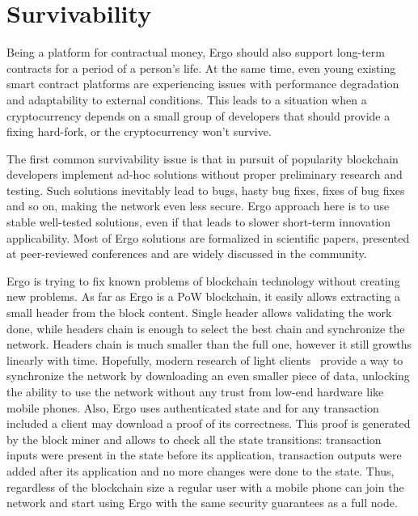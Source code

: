 \section{Survivability}
\label{sec:survivability}


Being a platform for contractual money, Ergo should also support long-term contracts for a
period of a person's life.
At the same time, even young existing smart contract platforms are experiencing issues with performance degradation and
adaptability to external conditions.
This leads to a situation when a cryptocurrency depends on a small group of developers
that should provide a fixing hard-fork, or the cryptocurrency won't survive.

The first common survivability issue is that in pursuit of popularity blockchain developers implement ad-hoc
solutions without proper preliminary research and testing.
Such solutions inevitably lead to bugs, hasty bug fixes, fixes of bug fixes and so on, making the network even less secure.
Ergo approach here is to use stable well-tested solutions, even if that leads to slower
short-term innovation applicability.
Most of Ergo solutions are formalized in scientific papers, presented at peer-reviewed conferences
and are widely discussed in the community.

Ergo is trying to fix known problems of blockchain technology without creating new problems.
As far as Ergo is a PoW blockchain, it easily allows extracting a small header from the block content.
Single header allows validating the work done, while headers chain is enough to select the best chain
and synchronize the network.
Headers chain is much smaller than the full one, however it still growths linearly with time.
Hopefully, modern research of light clients~\cite{kiayias2017non,luuflyclient} provide a way to
synchronize the network by downloading an even smaller piece of data, unlocking the ability to
use the network without any trust from low-end hardware like mobile phones.
Also, Ergo uses authenticated state\cite{reyzin2017improving} and for any transaction included
a client may download a proof of its correctness.
This proof is generated by the block miner and allows to check all the state transitions:
transaction inputs were present in the state before its application,
transaction outputs were added after its application and no more changes were done to the state.
Thus, regardless of the blockchain size a regular user with
a mobile phone can join the network and start using Ergo with the same security
guarantees as a full node.

